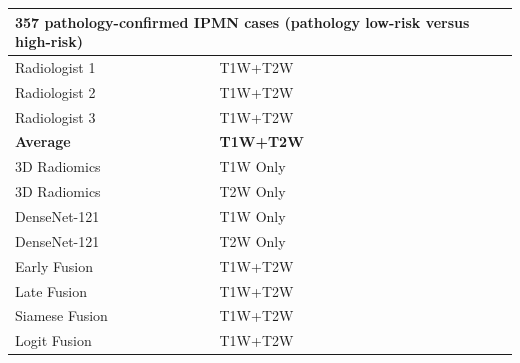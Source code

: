 \begin{table}[tb]
\begin{center}
\begin{small}
{\begin{tabular}{ll|ll|ll}
\multicolumn{6}{l}{\color{blue}\textbf{357 pathology-confirmed IPMN cases (pathology low-risk versus high-risk)}}\\
\hline
\rowcolor{g2}\color{blue}Radiologist 1&\color{blue}T1W+T2W&\color{blue}&\color{blue}&\color{blue}&\color{blue}\\
\rowcolor{g2}\color{blue}Radiologist 2&\color{blue}T1W+T2W&\color{blue}&\color{blue}&\color{blue}&\color{blue}\\
\rowcolor{g2}\color{blue}Radiologist 3&\color{blue}T1W+T2W&\color{blue}&\color{blue}&\color{blue}&\color{blue}\\
\rowcolor{g2}\color{blue}\bf{Average}&\color{blue}\bf{T1W+T2W}&\color{blue}&\color{blue}&\color{blue}&\color{blue}\\
\hline
\rowcolor{g3}\color{blue}3D Radiomics&\color{blue}T1W Only&\color{blue}&\color{blue}&\color{blue}&\color{blue}\\
\rowcolor{g3}\color{blue}3D Radiomics&\color{blue}T2W Only&\color{blue}&\color{blue}&\color{blue}&\color{blue}\\
\hline
\rowcolor{g3}\color{blue}DenseNet-121&\color{blue}T1W Only&\color{blue}&\color{blue}&\color{blue}&\color{blue}\\
\rowcolor{g3}\color{blue}DenseNet-121&\color{blue}T2W Only&\color{blue}&\color{blue}&\color{blue}&\color{blue}\\%
\rowcolor{g3}\color{blue}Early Fusion&\color{blue}T1W+T2W&\color{blue}&\color{blue}&\color{blue}&\color{blue}\\
\rowcolor{g3}\color{blue}Late Fusion&\color{blue}T1W+T2W&\color{blue}&\color{blue}&\color{blue}&\color{blue}\\
\rowcolor{g3}\color{blue}Siamese Fusion&\color{blue}T1W+T2W&\color{blue}&\color{blue}&\color{blue}&\color{blue}\\
\rowcolor{g3}\color{blue}Logit Fusion&\color{blue}T1W+T2W&\color{blue}&\color{blue}&\color{blue}&\color{blue}\\
\bottomrule
\end{tabular}}
\label{tab: ai vs human}
\end{small}
\end{center}
\end{table}
